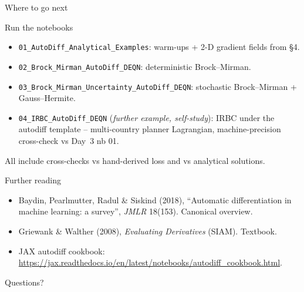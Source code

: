 \documentclass[aspectratio=169,11pt]{beamer}
\begin{document}
\begin{frame}[fragile,shrink=15]{Where to go next}
\footnotesize
\begin{block}{Run the notebooks}
\begin{itemize}\itemsep1pt
\item \texttt{01\_AutoDiff\_Analytical\_Examples}: warm-ups + 2-D gradient fields from \S 4.
\item \texttt{02\_Brock\_Mirman\_AutoDiff\_DEQN}: deterministic Brock--Mirman.
\item \texttt{03\_Brock\_Mirman\_Uncertainty\_AutoDiff\_DEQN}: stochastic Brock--Mirman + Gauss--Hermite.
\item \texttt{04\_IRBC\_AutoDiff\_DEQN} (\emph{further example, self-study}): IRBC under the autodiff template -- multi-country planner Lagrangian, machine-precision cross-check vs Day~3 nb 01.
\end{itemize}
All include cross-checks vs hand-derived loss and vs analytical solutions.
\end{block}
\begin{block}{Further reading}
\begin{itemize}\itemsep1pt
\item Baydin, Pearlmutter, Radul \& Siskind (2018), ``Automatic differentiation in machine learning: a survey'', \emph{JMLR} 18(153). Canonical overview.
\item Griewank \& Walther (2008), \emph{Evaluating Derivatives} (SIAM). Textbook.
\item JAX autodiff cookbook: \url{https://jax.readthedocs.io/en/latest/notebooks/autodiff_cookbook.html}.
\end{itemize}
\end{block}
\centerline{Questions?}
\end{frame}
\end{document}

